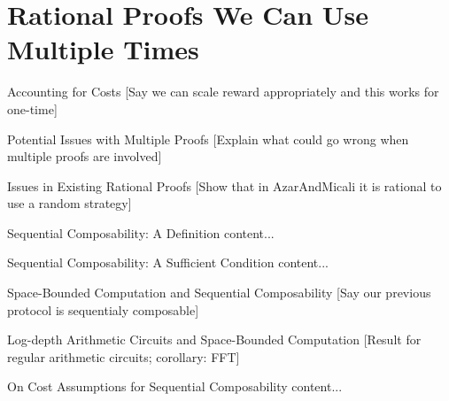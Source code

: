 \section{Rational Proofs We Can Use Multiple Times}

\begin{frame}{Accounting for Costs}
[Say we can scale reward appropriately and this works for one-time]
\end{frame}

\begin{frame}{Potential Issues with Multiple Proofs}
[Explain what could go wrong when multiple proofs are involved]
\end{frame}

\begin{frame}{Issues in Existing Rational Proofs}
	[Show that in AzarAndMicali it is rational to use a random strategy]
\end{frame}

\begin{frame}{Sequential Composability: A Definition}
	content...
\end{frame}

\begin{frame}{Sequential Composability: A Sufficient Condition}
	content...
\end{frame}

\begin{frame}{Space-Bounded Computation and Sequential Composability}
	[Say our previous protocol is sequentialy composable]
\end{frame}

\begin{frame}{Log-depth Arithmetic Circuits and Space-Bounded Computation}
[Result for regular arithmetic circuits; corollary: FFT]
\end{frame}

\begin{frame}{On Cost Assumptions for Sequential Composability}
	content...
\end{frame}